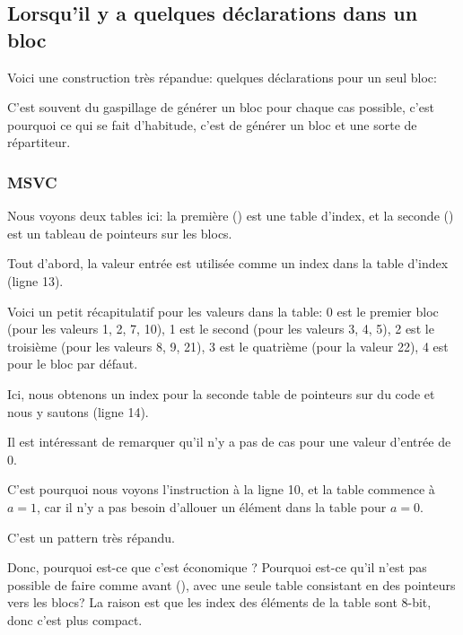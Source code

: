 \subsection{Lorsqu'il y a quelques déclarations  dans un bloc}

Voici une construction très répandue: quelques déclarations  pour un seul bloc:



C'est souvent du gaspillage de générer un bloc pour chaque cas possible, c'est
pourquoi ce qui se fait d'habitude, c'est de générer un bloc et une sorte de répartiteur.

\subsubsection{MSVC}



Nous voyons deux tables ici: la première () est une table d'index,
et la seconde () est un tableau de pointeurs sur les blocs.

Tout d'abord, la valeur entrée est utilisée comme un index dans la table d'index
(ligne 13).

Voici un petit récapitulatif pour les valeurs dans la table:
0 est le premier bloc  (pour les valeurs 1, 2, 7, 10),
1 est le second (pour les valeurs 3, 4, 5),
2 est le troisième (pour les valeurs 8, 9, 21),
3 est le quatrième (pour la valeur 22),
4 est pour le bloc par défaut.

Ici, nous obtenons un index pour la seconde table de pointeurs sur du code et nous
y sautons (ligne 14).

Il est intéressant de remarquer qu'il n'y a pas de cas pour une valeur d'entrée
de 0.

C'est pourquoi nous voyons l'instruction \DEC à la ligne 10, et la table commence
à $a=1$, car il n'y a pas besoin d'allouer un élément dans la table pour $a=0$.

C'est un pattern très répandu.

Donc, pourquoi est-ce que c'est économique ?
Pourquoi est-ce qu'il n'est pas possible de faire comme avant (),
avec une seule table consistant en des pointeurs vers les blocs?
La raison est que les index des éléments de la table sont 8-bit, donc c'est plus
compact.

